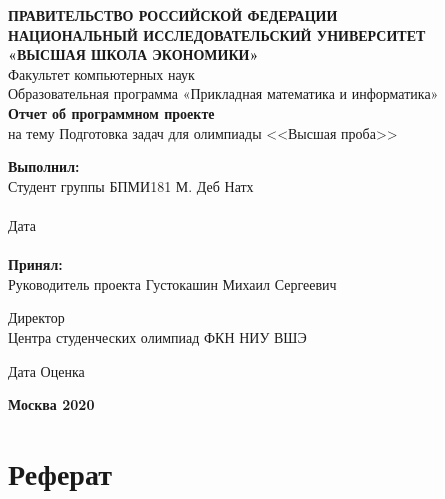 \documentclass[a4paper]{article}
\begin{document}
\begin{center}
    \textbf{ПРАВИТЕЛЬСТВО РОССИЙСКОЙ ФЕДЕРАЦИИ} \\
    \textbf{НАЦИОНАЛЬНЫЙ ИССЛЕДОВАТЕЛЬСКИЙ УНИВЕРСИТЕТ} \\
    \textbf{«ВЫСШАЯ ШКОЛА ЭКОНОМИКИ»} \\
    \hfill\break
    \normalsize{Факультет компьютерных наук} \\
    Образовательная программа «Прикладная математика и информатика» \\
    \vspace{4.2cm}
    \textbf{Отчет об программном проекте} \\
    \hfill\break
    на тему Подготовка задач для олимпиады <<Высшая проба>> \\
\end{center}
\vspace{3cm}
\textbf{Выполнил:} \\
Студент группы БПМИ181 \hfill \underline{\hspace{5cm}} \hfill М. Деб Натх \\
\vspace{0.1cm} \\
\hspace*{\fill} Дата \;\underline{\hspace{4cm}} \\
\vspace{0.1cm} \\
\textbf{Принял:} \\
Руководитель проекта \hfill Густокашин Михаил Сергеевич
\begin{flushright}
    Директор \\
    Центра студенческих олимпиад ФКН НИУ ВШЭ
\end{flushright}
\vspace{0.5cm}
Дата \;\underline{\hspace{4cm}} \hfill
Оценка \quad \underline{\hspace{1.5cm}} \hfill
\underline{\hspace{5cm}} \\
\vfill
\begin{center}
    \textbf{Москва 2020}
\end{center}
\thispagestyle{empty}

\newpage

\section{Реферат}
\end{document}
